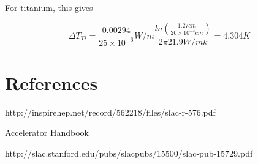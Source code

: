 \documentclass[12pt]{article}
\begin{document}
For titanium, this gives

\begin{equation}
\Delta T_{Ti}=\frac{0.00294}{25 \times 10^{-6}} W/m \frac{ln(\frac{1.27 cm}{20 \times 10^{-4} cm})}{2 \pi 21.9 W/mk}=4.304 K
\end{equation}


\section*{References}
\begin{enumerate}[{[}1{]}]
\item http://inspirehep.net/record/562218/files/slac-r-576.pdf
\item Accelerator Handbook
\item http://slac.stanford.edu/pubs/slacpubs/15500/slac-pub-15729.pdf

\end{enumerate}
\end{document}
